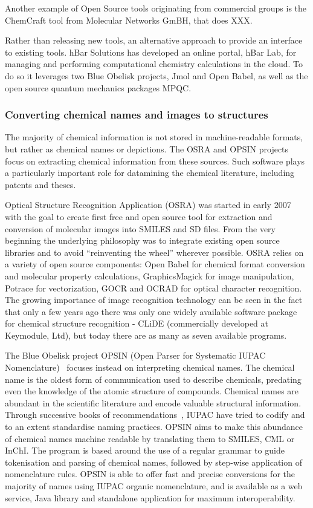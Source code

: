 \documentclass[10pt]{bmc_article}
\newenvironment{bmcformat}{\begin{raggedright}\baselineskip20pt\sloppy\setboolean{publ}{false}}{\end{raggedright}\baselineskip20pt\sloppy}
\begin{document}
\begin{bmcformat}
Another example of Open Source
tools originating from commercial groups is the ChemCraft tool from
Molecular Networks GmBH, that does XXX.

Rather than releasing new tools, an alternative approach to provide an
interface to existing tools. hBar Solutions has developed an online
portal, hBar Lab, for managing and performing computational chemistry
calculations in the cloud. To do so it leverages two Blue Obelisk
projects, Jmol and Open Babel, as well as the open source quantum
mechanics packages MPQC.

\subsubsection*{Converting chemical names and images to structures}

The majority of chemical information is not stored in machine-readable
formats, but rather as chemical names or depictions. The OSRA and OPSIN
projects focus on extracting chemical information from these sources.
Such software plays a particularly important role for datamining the
chemical literature, including patents and theses.

Optical Structure Recognition Application (OSRA) \cite{WebOSRA} was started
in early 2007 with the goal to create first free and open source
tool for extraction and conversion of molecular images into SMILES and
SD files. From the very beginning the underlying philosophy was to integrate
existing open source libraries and to avoid ``reinventing the wheel''
wherever possible. OSRA relies on a variety of open source components:
Open Babel for chemical format
conversion and molecular property calculations, GraphicsMagick for image
manipulation, Potrace for vectorization, GOCR and OCRAD for optical
character recognition. The growing importance of image
recognition technology can be seen in the fact that 
only a few years ago there was only one widely available software
package for chemical structure recognition -  CLiDE (commercially
developed at Keymodule, Ltd), but today there are as many as seven
available programs.

The Blue Obelisk project OPSIN (Open Parser for Systematic IUPAC
Nomenclature)~\cite{lowe_chemical_2011} focuses instead on interpreting chemical names.
The chemical name is the oldest form of communication used to
describe chemicals, predating
even the knowledge of the atomic structure of compounds.
Chemical names are abundant in the scientific
literature and encode valuable structural information.
Through successive books of
recommendations~\cite{iupac_nomenclature_1979, iupac_guide_1993},
IUPAC have tried to codify and to an extent standardise naming practices.
OPSIN aims to make this abundance of
chemical names machine readable by translating them to SMILES, CML or
InChI. The program is based around the use of a regular grammar to
guide tokenisation and parsing of chemical names, followed by
step-wise application of nomenclature rules. OPSIN is able to offer
fast and precise conversions for the majority of names using IUPAC
organic nomenclature, and is available as a web service, Java
library and standalone application for maximum interoperability.


\end{bmcformat}
\end{document}
